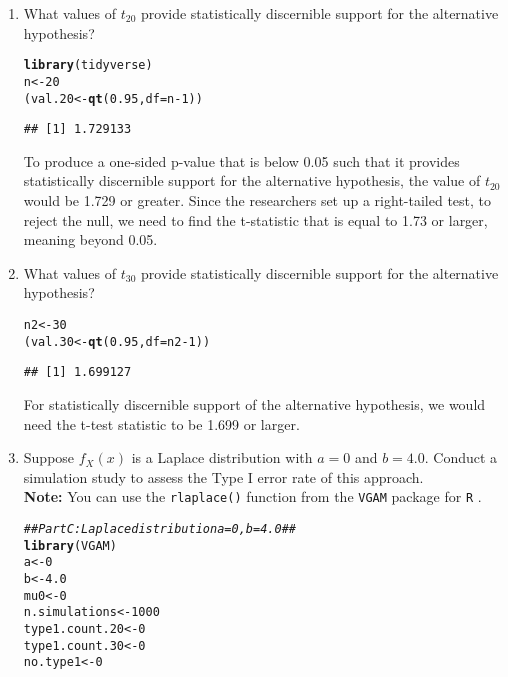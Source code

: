 \documentclass{article}\usepackage[]{graphicx}\usepackage[]{xcolor}
\makeatletter
\newcommand{\hlnum}[1]{\textcolor[rgb]{0.686,0.059,0.569}{#1}}%
\newcommand{\hlcom}[1]{\textcolor[rgb]{0.678,0.584,0.686}{\textit{#1}}}%
\newcommand{\hlopt}[1]{\textcolor[rgb]{0,0,0}{#1}}%
\newcommand{\hldef}[1]{\textcolor[rgb]{0.345,0.345,0.345}{#1}}%
\newcommand{\hlkwb}[1]{\textcolor[rgb]{0.69,0.353,0.396}{#1}}%
\newcommand{\hlkwc}[1]{\textcolor[rgb]{0.333,0.667,0.333}{#1}}%
\newcommand{\hlkwd}[1]{\textcolor[rgb]{0.737,0.353,0.396}{\textbf{#1}}}%
\newenvironment{kframe}{%
 \def\at@end@of@kframe{}%
 \ifinner\ifhmode%
  \def\at@end@of@kframe{\end{minipage}}%
  \begin{minipage}{\columnwidth}%
 \fi\fi%
 \def\FrameCommand##1{\hskip\@totalleftmargin \hskip-\fboxsep
 \colorbox{shadecolor}{##1}\hskip-\fboxsep
     \hskip-\linewidth \hskip-\@totalleftmargin \hskip\columnwidth}%
 \MakeFramed {\advance\hsize-\width
   \@totalleftmargin\z@ \linewidth\hsize
   \@setminipage}}%
 {\par\unskip\endMakeFramed%
 \at@end@of@kframe}
\newenvironment{knitrout}{}{} %
\makeatother
\begin{document}
\begin{enumerate}
\begin{enumerate}
  \item What values of $t_{20}$ provide statistically discernible support for the
  alternative hypothesis?
\begin{knitrout}
\color{fgcolor}\begin{kframe}
\begin{alltt}
\hlkwd{library}\hldef{(tidyverse)}
\hldef{n} \hlkwb{<-} \hlnum{20}
\hldef{(val.20} \hlkwb{<-} \hlkwd{qt}\hldef{(}\hlnum{0.95}\hldef{,}\hlkwc{df} \hldef{= n}\hlopt{-}\hlnum{1}\hldef{))}
\end{alltt}
\begin{verbatim}
## [1] 1.729133
\end{verbatim}
\end{kframe}
\end{knitrout}
To produce a one-sided p-value that is below 0.05 such that it provides statistically discernible support for the alternative hypothesis, the value of $t_{20}$ would be 1.729 or greater. Since the researchers set up a right-tailed test, to reject the null, we need to find the t-statistic that is equal to 1.73 or larger, meaning beyond 0.05. 
  \item What values of $t_{30}$ provide statistically discernible support for the
  alternative hypothesis?
\begin{knitrout}
\color{fgcolor}\begin{kframe}
\begin{alltt}
\hldef{n2} \hlkwb{<-} \hlnum{30}
\hldef{(val.30} \hlkwb{<-} \hlkwd{qt}\hldef{(}\hlnum{0.95}\hldef{,}\hlkwc{df} \hldef{= n2}\hlopt{-}\hlnum{1}\hldef{))}
\end{alltt}
\begin{verbatim}
## [1] 1.699127
\end{verbatim}
\end{kframe}
\end{knitrout}
For statistically discernible support of the alternative hypothesis, we would need the t-test statistic to be 1.699 or larger.
  \item Suppose $f_X(x)$ is a Laplace distribution with $a=0$ and $b=4.0$.
  Conduct a simulation study to assess the Type I error rate of this approach.\\
  \textbf{Note:} You can use the \texttt{rlaplace()} function from the \texttt{VGAM}
  package for \texttt{R} \citep{VGAM}.
\begin{knitrout}
\color{fgcolor}\begin{kframe}
\begin{alltt}
\hlcom{## Part C: Laplace distribution a = 0, b = 4.0 ##}
\hlkwd{library}\hldef{(VGAM)}
\hldef{a} \hlkwb{<-} \hlnum{0}
\hldef{b} \hlkwb{<-} \hlnum{4.0}
\hldef{mu0} \hlkwb{<-} \hlnum{0}
\hldef{n.simulations} \hlkwb{<-} \hlnum{1000}
\hldef{type1.count.20} \hlkwb{<-} \hlnum{0}
\hldef{type1.count.30} \hlkwb{<-} \hlnum{0}
\hldef{no.type1} \hlkwb{<-} \hlnum{0}


\end{alltt}
\end{kframe}
\end{knitrout}
\end{enumerate}
\end{enumerate}
\end{document}
